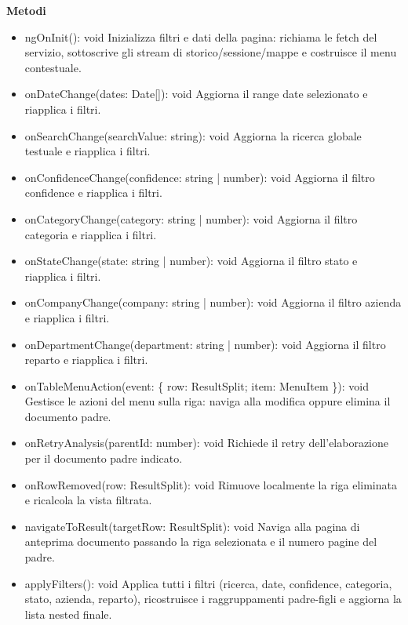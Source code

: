 \documentclass[a4paper,11pt]{article}
\begin{document}
\textbf{Metodi}
\begin{itemize}[noitemsep, topsep=0pt]
\item ngOnInit(): void
Inizializza filtri e dati della pagina: richiama le fetch del servizio, sottoscrive gli stream di storico/sessione/mappe e costruisce il menu contestuale.

\item onDateChange(dates: Date[]): void
Aggiorna il range date selezionato e riapplica i filtri.

\item onSearchChange(searchValue: string): void
Aggiorna la ricerca globale testuale e riapplica i filtri.

\item onConfidenceChange(confidence: string | number): void
Aggiorna il filtro confidence e riapplica i filtri.

\item onCategoryChange(category: string | number): void
Aggiorna il filtro categoria e riapplica i filtri.

\item onStateChange(state: string | number): void
Aggiorna il filtro stato e riapplica i filtri.

\item onCompanyChange(company: string | number): void
Aggiorna il filtro azienda e riapplica i filtri.

\item onDepartmentChange(department: string | number): void
Aggiorna il filtro reparto e riapplica i filtri.

\item onTableMenuAction(event: \{ row: ResultSplit; item: MenuItem \}): void
Gestisce le azioni del menu sulla riga: naviga alla modifica oppure elimina il documento padre.

\item onRetryAnalysis(parentId: number): void
Richiede il retry dell’elaborazione per il documento padre indicato.

\item onRowRemoved(row: ResultSplit): void
Rimuove localmente la riga eliminata e ricalcola la vista filtrata.

\item navigateToResult(targetRow: ResultSplit): void
Naviga alla pagina di anteprima documento passando la riga selezionata e il numero pagine del padre.

\item applyFilters(): void
Applica tutti i filtri (ricerca, date, confidence, categoria, stato, azienda, reparto), ricostruisce i raggruppamenti padre-figli e aggiorna la lista nested finale.


\end{itemize}
\end{document}
